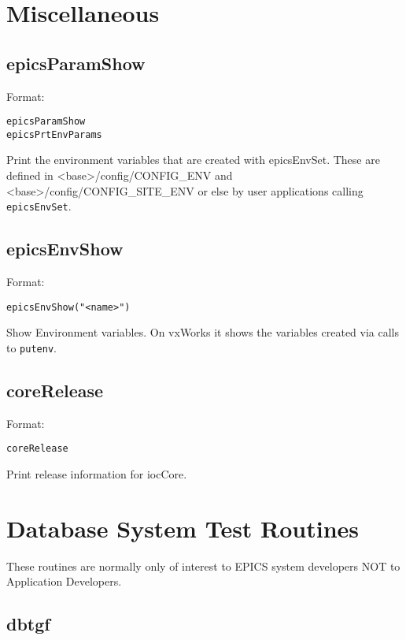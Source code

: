 \section{Miscellaneous}

\subsection{epicsParamShow}

Format:

\begin{verbatim}
epicsParamShow
epicsPrtEnvParams
\end{verbatim}

Print the environment variables that are created with epicsEnvSet. These are defined in \textless{}base\textgreater{}/config/CONFIG\_ENV 
and \textless{}base\textgreater{}/config/CONFIG\_SITE\_ENV or else by user applications calling \verb|epicsEnvSet|.

\subsection{epicsEnvShow}

Format:

\begin{verbatim}
epicsEnvShow("<name>")
\end{verbatim}

Show Environment variables. On vxWorks it shows the variables created via calls to \verb|putenv|.

\subsection{coreRelease}

Format:

\begin{verbatim}
coreRelease
\end{verbatim}

Print release information for iocCore.

\section{Database System Test Routines}

These routines are normally only of interest to EPICS system developers NOT to Application Developers.

\subsection{dbtgf}

